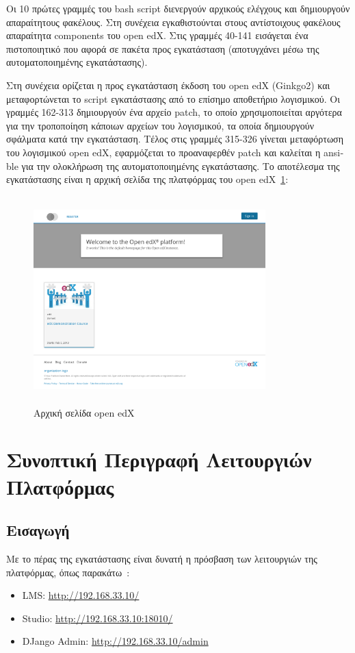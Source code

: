 \documentclass[12pt]{report}
\begin{document}
Οι 10 πρώτες γραμμές του \textlatin{bash script} διενεργούν αρχικούς ελέγχους και δημιουργούν απαραίτητους φακέλους. Στη συνέχεια εγκαθιστούνται στους αντίστοιχους φακέλους απαραίτητα \textlatin{components} του \textlatin{open edX}. Στις γραμμές 40-141 εισάγεται ένα πιστοποιητικό που αφορά σε πακέτα προς εγκατάσταση (αποτυγχάνει μέσω της αυτοματοποιημένης εγκατάστασης).

Στη συνέχεια ορίζεται η προς εγκατάσταση έκδοση του \textlatin{open edX (Ginkgo2)} και μεταφορτώνεται το \textlatin{script} εγκατάστασης από το επίσημο αποθετήριο λογισμικού. Οι γραμμές 162-313 δημιουργούν ένα αρχείο \textlatin{patch}, το οποίο χρησιμοποιείται αργότερα για την τροποποίηση κάποιων αρχείων του λογισμικού, τα οποία δημιουργούν σφάλματα κατά την εγκατάσταση. Τέλος στις γραμμές 315-326 γίνεται μεταφόρτωση του λογισμικού \textlatin{open edX}, εφαρμόζεται το προαναφερθέν \textlatin{patch} και καλείται η \textlatin{ansible} για την ολοκλήρωση της αυτοματοποιημένης εγκατάστασης. Το αποτέλεσμα της εγκατάστασης είναι η αρχική σελίδα της πλατφόρμας του \textlatin{open edX}~\ref{fig:edx_landing}:
\begin{figure}[h]
\centering
\includegraphics[width=0.8\textwidth, height=8cm]{openedx-start}
\caption{Αρχική σελίδα \textlatin{open edX}}
\label{fig:edx_landing}
\end{figure}

\section{Συνοπτική Περιγραφή Λειτουργιών Πλατφόρμας}
\subsection{Εισαγωγή}\label{edx_intro}
Με το πέρας της εγκατάστασης είναι δυνατή η πρόσβαση των λειτουργιών της πλατφόρμας, όπως παρακάτω~\cite{confluence_1}:
\begin{itemize}
  \item \textlatin{LMS: \url{http://192.168.33.10/}}
  \item \textlatin{Studio: \url{http://192.168.33.10:18010/}}
  \item \textlatin{DJango Admin: \url{http://192.168.33.10/admin}}
\end{itemize}
\end{document}

